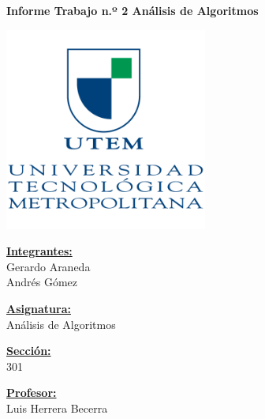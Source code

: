 \documentclass[12pt]{article}
\begin{document}
\begin{titlepage}
    \centering
    \vspace*{1cm}

    \Huge
    \textbf{Informe Trabajo n.º 2 Análisis de Algoritmos}

    \vspace{1cm}

    \includegraphics[width=0.5\textwidth]{Logo_UTEM.png}

    \vspace{0.1cm}

    \Large
    

\begin{flushleft}

    \textbf{\underline{Integrantes:}}\\
    Gerardo Araneda\\
    Andrés Gómez\\

    \vspace{0.6cm}

    \textbf{\underline{Asignatura:}}\\
    Análisis de Algoritmos

    \vspace{0.6cm}

    \textbf{\underline{Sección:}}\\
    301
    
    \vspace{0.6cm}

    \textbf{\underline{Profesor:}}\\
    Luis Herrera Becerra
  
\end{flushleft}

\end{titlepage}

\tableofcontents
\newpage
\end{document}
